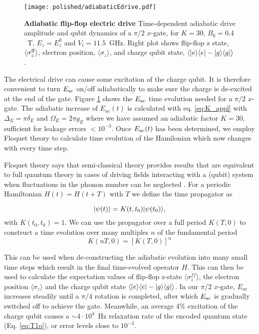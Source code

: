 \begin{figure}[h]
	\centering
	\texttt{[image: polished/adiabaticEdrive.pdf]}
	\caption[Adiabatic flip-flop electric drive]{\textbf{Adiabatic flip-flop electric drive} Time-dependent adiabatic drive amplitude and qubit dynamics of a $\pi/2$ $x$-gate, for $K=30$, $B_0=0.4$~T, $E_z=E_z^0$ and $V_t=11.5$~GHz. Right plot shows flip-flop z state, $\langle\sigma_z^{\rm ff}\rangle$, electron position, $\langle\sigma_z\rangle$, and charge qubit state, $\langle|e\rangle\langle e|-|g\rangle\langle g|\rangle$.}
		\label{fig:adEdrive}
\end{figure}

The electrical drive can cause some excitation of the charge qubit. It is therefore convenient to turn $E_{\rm ac}$ on/off adiabatically to make sure the charge is de-excited at the end of the gate. Figure \ref{fig:adEdrive} shows the $E_{\rm ac}$ time evolution needed for a $\pi/2$ $x$-gate. The adiabatic increase of $E_{ac}(t)$ is calculated with eq. \eqref{eq:K_appl} with $\Delta_E=\pi\delta_E$ and $\Omega_{E}=2\pi g_E$ where we have assumed an adiabatic factor $K=30$, sufficient for leakage errors $<10^{-3}$. Once $E_{\rm ac}(t)$ has been determined, we employ Floquet theory to calculate time evolution of the Hamilonian which now changes with every time step.  

Floquet theory says that semi-classical theory provides results that are equivalent to full quantum theory in cases of driving fields interacting with a (qubit) system when fluctuations in the phonon number can be neglected \cite{floquet}. For a periodic Hamiltonian $H(t)=H(t+T)$ with $T$ we define the time propagator as 

\begin{equation}
|\psi(t)\rangle=K(t,t_0)|\psi(t_0)\rangle,
\end{equation}
with $K(t_0,t_0)=1$. We can use the propagator over a full period $K(T,0)$ to construct a time evolution over many multiples $n$ of the fundamental period
\begin{equation}
K(nT,0)=[K(T,0)]^n
\end{equation}

This can be used when de-constructing the adiabatic evolution into many small time steps which result in the final time-evolved operator $H$. This can then be used to calculate the expectation values of flip-flop z-state $\langle \sigma_z^{ff}\rangle$, the electron position $\langle \sigma_z\rangle$ and the charge qubit state $\langle |e\rangle\langle e|-|g\rangle\langle g|\rangle$. 
In our $\pi/2$ $x$-gate, $E_{ac}$ increases steadily until a $\pi/4$ rotation is completed, after which $E_{\rm ac}$ is gradually switched off to achieve the gate. Meanwhile, an average 4\% excitation of the charge qubit causes a $\sim4\cdot 10^4$~Hz relaxation rate of the encoded quantum state (Eq. \ref{eq:T1o}), or error levels close to $10^{-3}$. 

